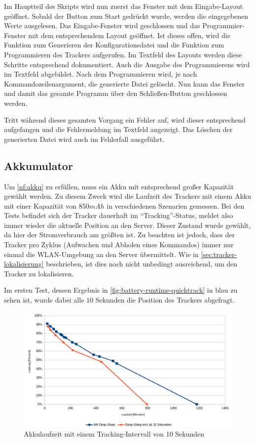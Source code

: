 Im Hauptteil des Skripts wird nun zuerst das Fenster mit dem Eingabe-Layout geöffnet.
Sobald der Button zum Start gedrückt wurde, werden die eingegebenen Werte ausgelesen.
Das Eingabe-Fenster wird geschlossen und das Programmier-Fenster mit dem entsprechendem Layout geöffnet.
Ist dieses offen, wird die Funktion zum Generieren der Konfigurationsdatei und die Funktion zum Programmieren des Trackers aufgerufen.
Im Textfeld des Layouts werden diese Schritte entsprechend dokumentiert.
Auch die Ausgabe des Programmierens wird im Textfeld abgebildet.
Nach dem Programmieren wird, je nach Kommandozeilenargument, die generierte Datei gelöscht.
Nun kann das Fenster und damit das gesamte Programm über den Schließen-Button geschlossen werden.

Tritt während dieses gesamten Vorgang ein Fehler auf, wird dieser entsprechend aufgefangen und die Fehlermeldung im Textfeld angezeigt.
Das Löschen der generierten Datei wird auch im Fehlerfall ausgeführt.

\subsection{Akkumulator}

Um \ref*{nf:akku} zu erfüllen, muss ein \gls{Akku} mit entsprechend großer Kapazität gewählt werden.
Zu diesem Zweck wird die Laufzeit des Trackers mit einem \gls{Akku} mit einer Kapazität von $850
mAh$ in verschiedenen Szenarien gemessen. Bei den Tests befindet sich der Tracker dauerhaft im
\enquote{Tracking}-Status, meldet also immer wieder die aktuelle Position an den Server. Dieser
Zustand wurde gewählt, da hier der Stromverbrauch am größten ist. Zu beachten ist jedoch, dass der
Tracker pro Zyklus (Aufwachen und Abholen eines Kommandos) immer nur einmal die \gls{WLAN}-Umgebung an den Server übermittelt. Wie in
\autoref{sec:tracker-lokalisierung} beschrieben, ist dies noch nicht unbedingt ausreichend, um den
Tracker zu lokalisieren.

Im ersten Test, dessen Ergebnis in
\autoref{fig:battery-runtime-quicktrack} in blau zu sehen ist, wurde dabei alle $10$ Sekunden die Position
des Trackers abgefragt.

\begin{figure}[htbp]
	\centering
	\includegraphics[width=.9\textwidth]{images/battery-runtime-quicktrack.png}
	\caption{Akkulaufzeit mit einem Tracking-Intervall von 10 Sekunden}
	\label{fig:battery-runtime-quicktrack}
\end{figure}

